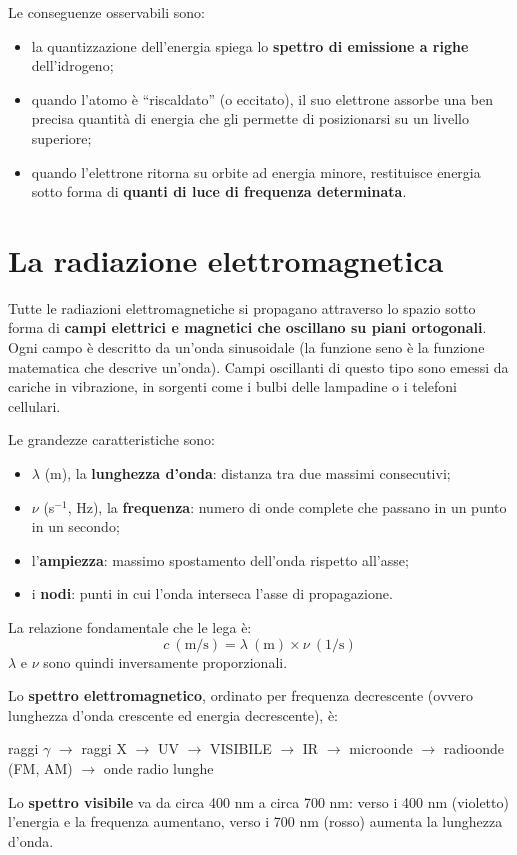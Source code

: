 \documentclass[11pt, a4paper, openright]{book}
\begin{document}
Le conseguenze osservabili sono:
\begin{itemize}
    \item la quantizzazione dell'energia spiega lo \textbf{spettro di emissione a righe} dell'idrogeno;
    \item quando l'atomo è ``riscaldato'' (o eccitato), il suo elettrone assorbe una ben precisa quantità di energia che gli permette di posizionarsi su un livello superiore;
    \item quando l'elettrone ritorna su orbite ad energia minore, restituisce energia sotto forma di \textbf{quanti di luce di frequenza determinata}.
\end{itemize}

\newpage

\section{La radiazione elettromagnetica}
Tutte le radiazioni elettromagnetiche si propagano attraverso lo spazio sotto forma di \textbf{campi elettrici e magnetici che oscillano su piani ortogonali}. Ogni campo è descritto da un'onda sinusoidale (la funzione seno è la funzione matematica che descrive un'onda). Campi oscillanti di questo tipo sono emessi da cariche in vibrazione, in sorgenti come i bulbi delle lampadine o i telefoni cellulari.

Le grandezze caratteristiche sono:
\begin{itemize}
    \item $\lambda$ (m), la \textbf{lunghezza d'onda}: distanza tra due massimi consecutivi;
    \item $\nu$ (s$^{-1}$, Hz), la \textbf{frequenza}: numero di onde complete che passano in un punto in un secondo;
    \item l'\textbf{ampiezza}: massimo spostamento dell'onda rispetto all'asse;
    \item i \textbf{nodi}: punti in cui l'onda interseca l'asse di propagazione.
\end{itemize}
La relazione fondamentale che le lega è:
\[
c\ (\mathrm{m/s}) = \lambda\ (\mathrm{m}) \times \nu\ (1/\mathrm{s})
\]
$\lambda$ e $\nu$ sono quindi inversamente proporzionali.

Lo \textbf{spettro elettromagnetico}, ordinato per frequenza decrescente (ovvero lunghezza d'onda crescente ed energia decrescente), è:
\begin{center}
raggi $\gamma$ $\rightarrow$ raggi X $\rightarrow$ UV $\rightarrow$ VISIBILE $\rightarrow$ IR $\rightarrow$ microonde $\rightarrow$ radioonde (FM, AM) $\rightarrow$ onde radio lunghe
\end{center}
Lo \textbf{spettro visibile} va da circa 400 nm a circa 700 nm: verso i 400 nm (violetto) l'energia e la frequenza aumentano, verso i 700 nm (rosso) aumenta la lunghezza d'onda.
\end{document}
